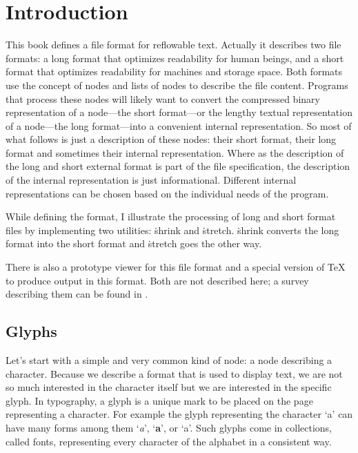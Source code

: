 \vskip 1cm


\tableofcontent


\mainmatter

\section{Introduction}\label{intro}
This book defines a file format for reflowable text.
Actually it describes two file formats: a long format
that optimizes readability for human beings, and
a short format that optimizes readability for machines
and storage space. Both formats use the concept of nodes and lists of
nodes to describe the file content. Programs that process these nodes
will likely want to convert the compressed binary representation of a
node---the short format---or the lengthy textual representation of a
node---the long format---into a convenient internal representation.
So most of what follows is just a description of these nodes: their short format,
their long format and sometimes their internal representation.
Where as the description of the long and short external format is part
of the file specification, the description of the internal representation
is just informational. Different internal representations can be chosen
based on the individual needs of the program.

While defining the format, I illustrate the processing of long and short format
files by implementing two utilities: \.{shrink} and \.{stretch}.
\.{shrink} converts the long format into the short format and \.{stretch}
goes the other way.

There is also a prototype viewer for this
file format and a special version of \TeX\cite{DK:texbook} to produce output
in this format. Both are not described here; a survey describing
them can be found in \cite{MR:tug39}.

\subsection{Glyphs}
Let's start with a simple and very common kind of node: a node describing
a character.
Because we describe a format that is used to display text,
we are not so much interested in the
character itself but we are interested in the specific glyph.
In typography, a glyph is a unique mark to be placed on the page representing
a character. For example the glyph representing the character `a' can have
many forms among them `{\it a\/}', `{\bf a}', or `{\tenss a}'.
Such glyphs come in collections, called fonts, representing every character
of the alphabet in a consistent way.

